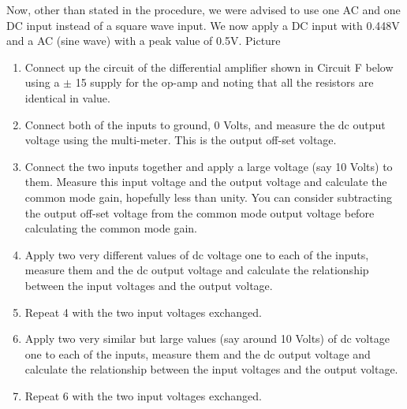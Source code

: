 Now, other than stated in the procedure, we were advised to use one AC and one DC input instead of a square wave input.
We now apply a DC input with 0.448V and a AC (sine wave) with a peak value of 0.5V.
Picture 




\begin{enumerate}
	\item  Connect up the circuit of the differential amplifier shown in Circuit F below using a $\pm$ 15
supply for the op-amp and noting that all the resistors are identical in value.
\item  Connect both of the inputs to ground, 0 Volts, and measure the dc output voltage using the
multi-meter. This is the output off-set voltage.

\item  Connect the two inputs together and apply a large voltage (say 10 Volts) to them. Measure
this input voltage and the output voltage and calculate the common mode gain, hopefully
less than unity. You can consider subtracting the output off-set voltage from the common
mode output voltage before calculating the common mode gain.

\item Apply two very different values of dc voltage one to each of the inputs, measure them and
the dc output voltage and calculate the relationship between the input voltages and the
output voltage.

\item  Repeat 4 with the two input voltages exchanged.

\item  Apply two very similar but large values (say around 10 Volts) of dc voltage one to each of
the inputs, measure them and the dc output voltage and calculate the relationship between
the input voltages and the output voltage.

\item  Repeat 6 with the two input voltages exchanged.
\end{enumerate}



